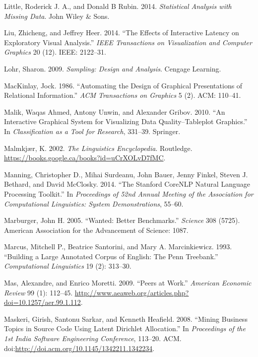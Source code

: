 \documentclass[]{krantz}
\begin{document}
\hypertarget{ref-little2014statistical}{}
Little, Roderick J. A., and Donald B Rubin. 2014. \emph{Statistical
Analysis with Missing Data}. John Wiley \& Sons.

\hypertarget{ref-liu2014effects}{}
Liu, Zhicheng, and Jeffrey Heer. 2014. ``The Effects of Interactive
Latency on Exploratory Visual Analysis.'' \emph{IEEE Transactions on
Visualization and Computer Graphics} 20 (12). IEEE: 2122--31.

\hypertarget{ref-lohr2009sampling}{}
Lohr, Sharon. 2009. \emph{Sampling: Design and Analysis}. Cengage
Learning.

\hypertarget{ref-mackinlay1986automating}{}
MacKinlay, Jock. 1986. ``Automating the Design of Graphical
Presentations of Relational Information.'' \emph{ACM Transactions on
Graphics} 5 (2). ACM: 110--41.

\hypertarget{ref-malik2010interactive}{}
Malik, Waqas Ahmed, Antony Unwin, and Alexander Gribov. 2010. ``An
Interactive Graphical System for Visualizing Data Quality--Tableplot
Graphics.'' In \emph{Classification as a Tool for Research}, 331--39.
Springer.

\hypertarget{ref-malmkjar-02}{}
Malmkjær, K. 2002. \emph{The Linguistics Encyclopedia}. Routledge.
\url{https://books.google.ca/books?id=uCrXOLvD7fMC}.

\hypertarget{ref-manning2014stanford}{}
Manning, Christopher D., Mihai Surdeanu, John Bauer, Jenny Finkel,
Steven J. Bethard, and David McClosky. 2014. ``The Stanford CoreNLP
Natural Language Processing Toolkit.'' In \emph{Proceedings of 52nd
Annual Meeting of the Association for Computational Linguistics: System
Demonstrations}, 55--60.

\hypertarget{ref-marburger2005wanted}{}
Marburger, John H. 2005. ``Wanted: Better Benchmarks.'' \emph{Science}
308 (5725). American Association for the Advancement of Science: 1087.

\hypertarget{ref-marcus-93}{}
Marcus, Mitchell P., Beatrice Santorini, and Mary A. Marcinkiewicz.
1993. ``Building a Large Annotated Corpus of English: The Penn
Treebank.'' \emph{Computational Linguistics} 19 (2): 313--30.

\hypertarget{ref-Mas2009}{}
Mas, Alexandre, and Enrico Moretti. 2009. ``Peers at Work.''
\emph{American Economic Review} 99 (1): 112--45.
\url{http://www.aeaweb.org/articles.php?doi=10.1257/aer.99.1.112}.

\hypertarget{ref-maskeri-08}{}
Maskeri, Girish, Santonu Sarkar, and Kenneth Heafield. 2008. ``Mining
Business Topics in Source Code Using Latent Dirichlet Allocation.'' In
\emph{Proceedings of the 1st India Software Engineering Conference},
113--20. ACM.
doi:\href{https://doi.org/http://doi.acm.org/10.1145/1342211.1342234}{http://doi.acm.org/10.1145/1342211.1342234}.
\end{document}
